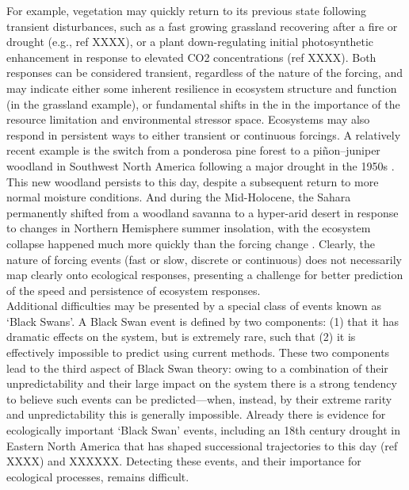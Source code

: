 \documentclass[11pt,a4paper,oneside]{article}
\begin{document}
\indent For example, vegetation may quickly return to its previous state following transient disturbances, such as a fast growing grassland recovering after a fire or drought (e.g., ref XXXX), or a plant down-regulating initial photosynthetic enhancement in response to elevated CO2 concentrations (ref XXXX). Both responses can be considered transient, regardless of the nature of the forcing, and may indicate either some inherent resilience in ecosystem structure and function (in the grassland example), or fundamental shifts in the in the importance of the resource limitation and environmental stressor space. Ecosystems may also respond in persistent ways to either transient or continuous forcings. A relatively recent example is the switch from a ponderosa pine forest to a piñon–juniper woodland in Southwest North America following a major drought in the 1950s \citep{Allen1998}. This new woodland persists to this day, despite a subsequent return to more normal moisture conditions. And during the Mid-Holocene, the Sahara permanently shifted from a woodland savanna to a hyper-arid desert in response to changes in Northern Hemisphere summer insolation, with the ecosystem collapse happened much more quickly than the forcing change \citep{Foley2003}. Clearly, the nature of forcing events (fast or slow, discrete or continuous) does not necessarily map clearly onto ecological responses, presenting a challenge for better prediction of the speed and persistence of ecosystem responses.\\

\indent Additional difficulties may be presented by a special class of events known as `Black Swans'. A Black Swan event is defined by two components: (1) that it has dramatic effects on the system, but is extremely rare, such that (2) it is effectively impossible to predict using current methods. These two components lead to the third aspect of Black Swan theory: owing to a combination of their unpredictability and their large impact on the system there is a strong tendency to believe such events can be predicted---when, instead, by their extreme rarity and unpredictability this is generally impossible. Already there is evidence for ecologically important `Black Swan' events, including an 18th century drought in Eastern North America that has shaped successional trajectories to this day (ref XXXX) and XXXXXX. Detecting these events, and their importance for ecological processes, remains difficult.\\ 
\end{document}
